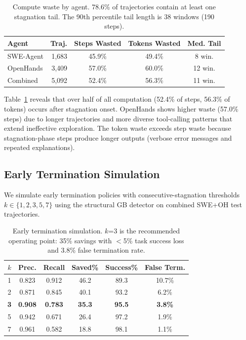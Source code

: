 \documentclass[11pt,a4paper]{article}
\begin{document}
\begin{table}[t]
\centering
\small
\begin{tabular}{lrccc}
\toprule
\textbf{Agent} & \textbf{Traj.} & \textbf{Steps Wasted} & \textbf{Tokens Wasted} & \textbf{Med. Tail} \\
\midrule
SWE-Agent & 1{,}683 & 45.9\% & 49.4\% & 8 win. \\
OpenHands & 3{,}409 & 57.0\% & 60.0\% & 12 win. \\
\midrule
Combined & 5{,}092 & 52.4\% & 56.3\% & 11 win. \\
\bottomrule
\end{tabular}
\caption{Compute waste by agent. 78.6\% of trajectories contain at least one stagnation tail. The 90th percentile tail length is 38 windows (190 steps).}
\label{tab:waste}
\end{table}

Table~\ref{tab:waste} reveals that over half of all computation (52.4\% of steps, 56.3\% of tokens) occurs after stagnation onset.
OpenHands shows higher waste (57.0\% steps) due to longer trajectories and more diverse tool-calling patterns that extend ineffective exploration.
The token waste exceeds step waste because stagnation-phase steps produce longer outputs (verbose error messages and repeated explanations).

\subsection{Early Termination Simulation}
\label{sec:termination}

We simulate early termination policies with consecutive-stagnation thresholds $k \in \{1,2,3,5,7\}$ using the structural GB detector on combined SWE+OH test trajectories.

\begin{table}[t]
\centering
\small
\begin{tabular}{cccccc}
\toprule
$k$ & \textbf{Prec.} & \textbf{Recall} & \textbf{Saved\%} & \textbf{Success\%} & \textbf{False Term.} \\
\midrule
1 & 0.823 & 0.912 & 46.2 & 89.3 & 10.7\% \\
2 & 0.871 & 0.845 & 40.1 & 93.2 & 6.2\% \\
\textbf{3} & \textbf{0.908} & \textbf{0.783} & \textbf{35.3} & \textbf{95.5} & \textbf{3.8\%} \\
5 & 0.942 & 0.671 & 26.4 & 97.2 & 1.9\% \\
7 & 0.961 & 0.582 & 18.8 & 98.1 & 1.1\% \\
\bottomrule
\end{tabular}
\caption{Early termination simulation. $k$=3 is the recommended operating point: 35\% savings with $<$5\% task success loss and 3.8\% false termination rate.}
\label{tab:termination}
\end{table}
\end{document}
